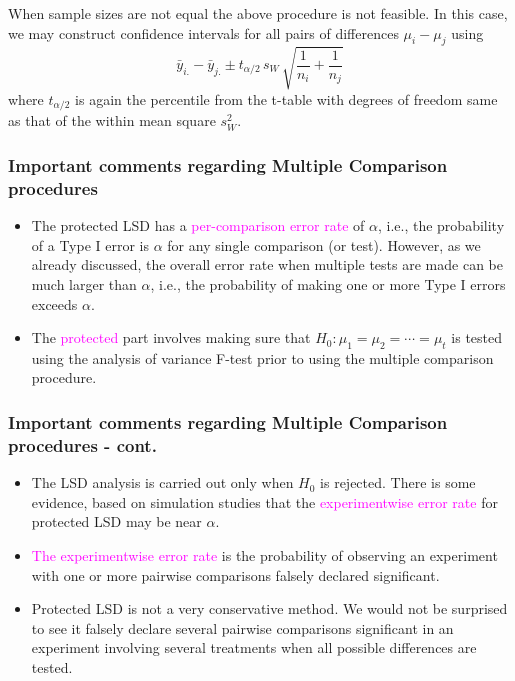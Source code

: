 \documentclass[xcolor=dvipsnames,12pt]{beamer}
\begin{document}
\begin{frame}
 When sample sizes are not equal the above procedure is not feasible.
In this case, we may construct confidence intervals for all pairs of
differences $\mu_i - \mu_j $ using
$$
 \bar{y}_{i.} - \bar{y}_{j.} \pm  t_{\alpha/2} \, s_W \, \sqrt{\frac{1}{n_i} + \frac{1}{n_j}}
$$
where $  t_{\alpha/2}$ is again the percentile from the 
t-table with degrees of freedom same as that of the within mean square
$s_W^2$.
\end{frame}


\begin{frame}
\frametitle{Important comments regarding Multiple Comparison procedures}
\begin{itemize}
\item The protected LSD has a {\textcolor{magenta}{per-comparison error rate}} 
of $\alpha$, i.e., the probability of a Type I error is $\alpha$ 
for any single comparison (or test).  However, as we already
discussed, the overall error rate when multiple tests are made 
can be much larger than $\alpha$, i.e.,  the probability of making 
one or more Type I errors exceeds $\alpha$.
\item The {\textcolor{magenta}{protected}} part involves making sure that 
$H_0: \mu_1 = \mu_2 = \cdots = \mu_t$ is tested using the 
analysis of variance F-test prior to using the multiple comparison
procedure. 
\end{itemize}
\end{frame}



\begin{frame}
\frametitle{Important comments regarding Multiple Comparison procedures - cont.}
\begin{itemize}
\item The LSD analysis is carried out only when $H_0$ is
rejected.  There is some evidence, based on 
simulation studies that the {\textcolor{magenta}{experimentwise error rate}} 
for protected LSD may be near $\alpha$.  
\item {\textcolor{magenta}{The experimentwise error
rate}} is the probability of observing an experiment with one or more 
pairwise comparisons falsely declared significant.
\item Protected LSD is not a very conservative method.  We would not be
surprised to see it falsely declare several pairwise comparisons
significant in an experiment involving several treatments when all
possible differences are tested.
\end{itemize}
\end{frame}
\end{document}
